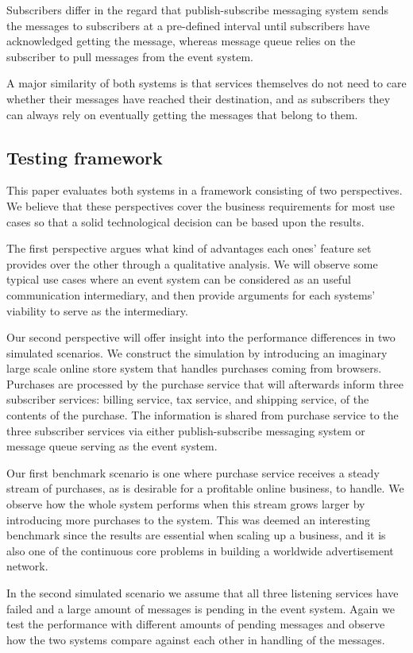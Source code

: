 \documentclass[conference]{IEEEtran}
\begin{document}
Subscribers differ in the regard that publish-subscribe messaging system sends the messages to subscribers at a pre-defined interval until subscribers have acknowledged getting the message, whereas message queue relies on the subscriber to pull messages from the event system.

A major similarity of both systems is that services themselves do not need to care whether their messages have reached their destination, and as subscribers they can always rely on eventually getting the messages that belong to them.

\subsection{Testing framework}
This paper evaluates both systems in a framework consisting of two perspectives. We believe that these perspectives cover the business requirements for most use cases so that a solid technological decision can be based upon the results.

The first perspective argues what kind of advantages each ones' feature set provides over the other through a qualitative analysis. We will observe some typical use cases where an event system can be considered as an useful communication intermediary, and then provide arguments for each systems' viability to serve as the intermediary.

Our second perspective will offer insight into the performance differences in two simulated scenarios. We construct the simulation by introducing an imaginary large scale online store system that handles purchases coming from browsers. Purchases are processed by the purchase service that will afterwards inform three subscriber services: billing service, tax service, and shipping service, of the contents of the purchase. The information is shared from purchase service to the three subscriber services via either publish-subscribe messaging system or message queue serving as the event system.

Our first benchmark scenario is one where purchase service receives a steady stream of purchases, as is desirable for a profitable online business, to handle. We observe how the whole system performs when this stream grows larger by introducing more purchases to the system. This was deemed an interesting benchmark since the results are essential when scaling up a business, and it is also one of the continuous core problems in building a worldwide advertisement network.

In the second simulated scenario we assume that all three listening services have failed and a large amount of messages is pending in the event system. Again we test the performance with different amounts of pending messages and observe how the two systems compare against each other in handling of the messages.
\end{document}
